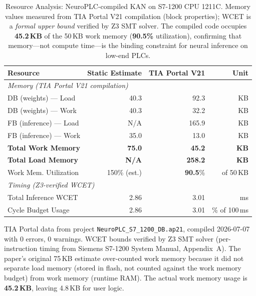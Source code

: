 \begin{table}[t]
\centering
\caption{Resource Analysis: NeuroPLC-compiled KAN \arch{} on S7-1200 CPU 1211C.
Memory values measured from TIA Portal V21 compilation (block properties);
WCET is a \emph{formal upper bound} verified by Z3 SMT solver.
The compiled code occupies \textbf{45.2\,KB} of the 50\,KB work memory
(\textbf{90.5\%} utilization), confirming that memory—not compute time—is the
binding constraint for neural inference on low-end PLCs.}
\label{tab:resource_analysis}
\small
\begin{tabular}{lrrr}
\toprule
\textbf{Resource} & \textbf{Static Estimate} & \textbf{TIA Portal V21} & \textbf{Unit} \\
\midrule
\multicolumn{4}{l}{\textit{Memory (TIA Portal V21 compilation)}} \\
\quad DB (weights) — Load  & 40.3 & 92.3 & KB \\
\quad DB (weights) — Work  & 40.3 & 32.2 & KB \\
\quad FB (inference) — Load & N/A & 165.9 & KB \\
\quad FB (inference) — Work & 35.0 & 13.0 & KB \\
\midrule
\quad \textbf{Total Work Memory} & \textbf{75.0} & \textbf{45.2} & \textbf{KB} \\
\quad \textbf{Total Load Memory} & \textbf{N/A} & \textbf{258.2} & \textbf{KB} \\
\quad Work Mem. Utilization   & 150\% (est.) & \textbf{90.5}\% & of 50\,KB \\
\midrule
\multicolumn{4}{l}{\textit{Timing (Z3-verified WCET)}} \\
\quad Total Inference WCET & 2.86 & 3.01 & ms \\
\quad Cycle Budget Usage    & 2.86 & 3.01 & \% of 100\,ms \\
\bottomrule
\end{tabular}

\vspace{4pt}
\footnotesize
TIA Portal data from project \texttt{NeuroPLC\_S7\_1200\_DB.ap21},
compiled 2026-07-07 with 0 errors, 0 warnings.
WCET bounds verified by Z3 SMT solver (per-instruction timing from
Siemens S7-1200 System Manual, Appendix~A).
The paper's original 75\,KB estimate over-counted work memory because
it did not separate load memory (stored in flash, not counted against
the work memory budget) from work memory (runtime RAM).
The actual work memory usage is \textbf{45.2\,KB}, leaving 4.8\,KB
for user logic.
\end{table}